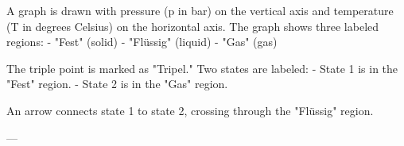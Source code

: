 A graph is drawn with pressure (p in bar) on the vertical axis and temperature (T in degrees Celsius) on the horizontal axis. The graph shows three labeled regions:  
- "Fest" (solid)  
- "Flüssig" (liquid)  
- "Gas" (gas)  

The triple point is marked as "Tripel." Two states are labeled:  
- State 1 is in the "Fest" region.  
- State 2 is in the "Gas" region.  

An arrow connects state 1 to state 2, crossing through the "Flüssig" region.

---